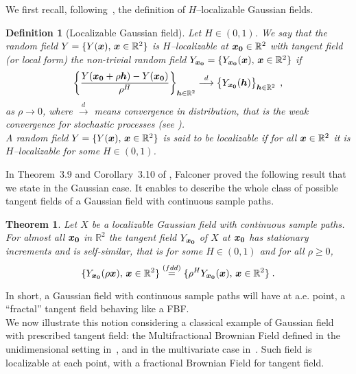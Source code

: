\documentclass{elsarticle}
\newtheorem{definition}{Definition}
\newtheorem{theorem}{Theorem}
\begin{document}
We first recall, following~\cite{BJR97,Falc02,Falc03}, the definition of $H$--localizable Gaussian fields.
\begin{definition}[Localizable Gaussian field]
Let $H\in (0,1)$. We say that the random field $Y = \{Y (\bm{x}),\, \bm{x}\in\mathbb{R}^2\}$ is $H$--localizable at $\bm{x_0}\in\mathbb{R}^2$ with \textit{tangent field} (or \textit{local form}) the non-trivial random field
$Y_{\bm{x_0}} = \{Y_{\bm{x_0}}(\bm{x}),\,\bm{x} \in\mathbb{R}^2\}$ if
\begin{equation}\label{e:def:localizable}
\left\{\frac{Y(\bm{x_0} + \rho\bm{h})-Y(\bm{x_0})}{\rho^H}\right\}_{\bm{h}\in \mathbb{R}^2} \overset{d}{\longrightarrow}\left\{Y_{\bm{x_0}}(\bm{h})\right\}_{\bm{h}\in \mathbb{R}^2}\;,
\end{equation}
as $\rho\to 0$, where $\overset{d}{\rightarrow}$ means convergence in distribution, that is the weak convergence for stochastic processes (see \cite{Bill68}). \\
A random field $Y= \{Y (\bm{x}),\, \bm{x}\in\mathbb{R}^2\}$ is said to be localizable if for all $\bm{x}\in\mathbb{R}^2$ it is $H$--localizable for some $H\in (0,1)$.
\end{definition}
In Theorem~3.9 and Corollary~3.10 of \cite{Falc02}, Falconer proved the
following result that we state in the Gaussian case. It enables
to describe the whole class of possible tangent fields of a Gaussian field with continuous sample paths.
%
\begin{theorem}\label{th:tangent:fields}
Let $X$ be a localizable Gaussian field with continuous sample paths. For almost all $\bm{x_0}$ in $\mathbb{R}^{2}$
the tangent field $Y_{\bm{x_0}}$ of $X$ at $\bm{x_0}$ has stationary increments and is self-similar, that is for some $H\in (0,1)$ and for all $\rho\geq 0$,
\begin{equation}
\{Y_{\bm{x_0}}(\rho \bm{x}),\,\bm{x}\in\mathbb{R}^2\}\overset{(fdd)}{=}\{\rho^H Y_{\bm{x_0}}(\bm{x}),\,\bm{x}\in\mathbb{R}^2\}\;.
\end{equation}
\end{theorem}
In short, a Gaussian field with continuous sample paths will have at a.e. point, a  ``fractal''  tangent field behaving like a FBF. \\
We now illustrate this notion considering a classical example of Gaussian field with prescribed tangent field: the Multifractional Brownian Field defined in the unidimensional setting in~\cite{LVPel95}, and in the multivariate case in~\cite{BJR97,Herb06}. Such field is localizable at each point, with a fractional Brownian Field for tangent field.
\end{document}
